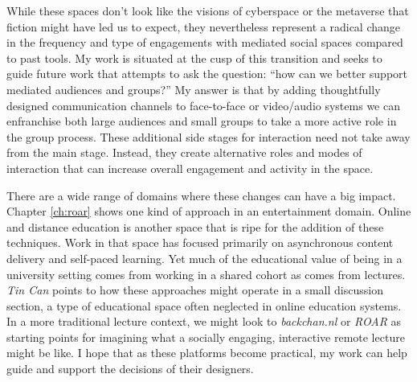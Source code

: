 While these spaces don't look like the visions of cyberspace or the metaverse that fiction might have led us to expect, they nevertheless represent a radical change in the frequency and type of engagements with mediated social spaces compared to past tools. My work is situated at the cusp of this transition and seeks to guide future work that attempts to ask the question: ``how can we better support mediated audiences and groups?'' My answer is that by adding thoughtfully designed communication channels to face-to-face or video/audio systems we can enfranchise both large audiences and small groups to take a more active role in the group process. These additional side stages for interaction need not take away from the main stage. Instead, they create alternative roles and modes of interaction that can increase overall engagement and activity in the space.

There are a wide range of domains where these changes can have a big impact. Chapter \ref{ch:roar} shows one kind of approach in an entertainment domain. Online and distance education is another space that is ripe for the addition of these techniques. Work in that space has focused primarily on asynchronous content delivery and self-paced learning. Yet much of the educational value of being in a university setting comes from working in a shared cohort as comes from lectures. \emph{Tin Can} points to how these approaches might operate in a small discussion section, a type of educational space often neglected in online education systems. In a more traditional lecture context, we might look to  \emph{backchan.nl} or \emph{ROAR} as starting points for imagining what a socially engaging, interactive remote lecture might be like. I hope that as these platforms become practical, my work can help guide and support the decisions of their designers.



